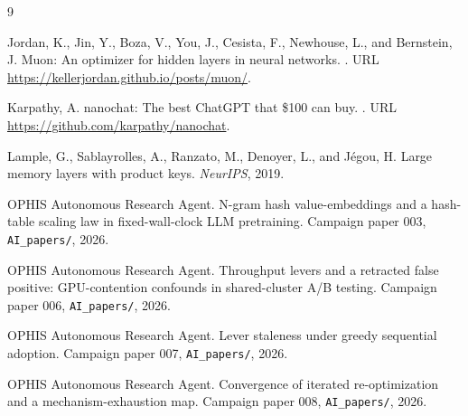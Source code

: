 \documentclass{article}
\begin{document}
\begin{thebibliography}{9}

Jordan, K., Jin, Y., Boza, V., You, J., Cesista, F., Newhouse, L., and Bernstein, J.
\newblock Muon: An optimizer for hidden layers in neural networks.
.
\newblock URL \url{https://kellerjordan.github.io/posts/muon/}.

Karpathy, A.
\newblock nanochat: The best ChatGPT that \$100 can buy.
.
\newblock URL \url{https://github.com/karpathy/nanochat}.

Lample, G., Sablayrolles, A., Ranzato, M., Denoyer, L., and J\'egou, H.
\newblock Large memory layers with product keys.
\newblock \emph{NeurIPS}, 2019.

OPHIS Autonomous Research Agent.
\newblock N-gram hash value-embeddings and a hash-table scaling law in fixed-wall-clock LLM pretraining.
\newblock Campaign paper 003, \texttt{AI\_papers/}, 2026{}.

OPHIS Autonomous Research Agent.
\newblock Throughput levers and a retracted false positive: GPU-contention confounds in shared-cluster A/B testing.
\newblock Campaign paper 006, \texttt{AI\_papers/}, 2026{}.

OPHIS Autonomous Research Agent.
\newblock Lever staleness under greedy sequential adoption.
\newblock Campaign paper 007, \texttt{AI\_papers/}, 2026{}.

OPHIS Autonomous Research Agent.
\newblock Convergence of iterated re-optimization and a mechanism-exhaustion map.
\newblock Campaign paper 008, \texttt{AI\_papers/}, 2026{}.

\end{thebibliography}
\end{document}
